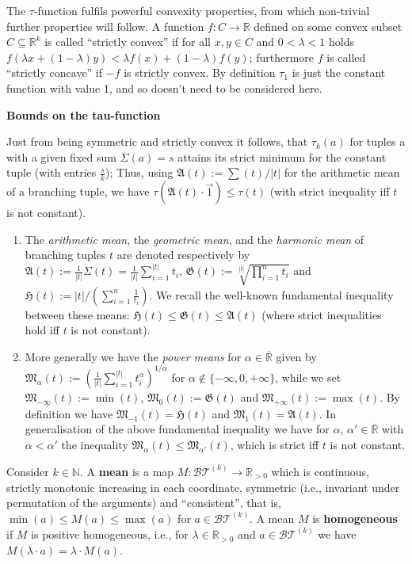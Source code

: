 \documentclass{report}
\begin{document}
\begin{enumerate}
\begin{enumerate}
				The $\tau $-function fulfils powerful convexity properties, from which non-trivial
				further properties will follow. A function $f : C \to \mathbb{R}$ defined on some convex
				subset $C \subseteq \mathbb{R}^k$ is called ``strictly convex'' if for all $x,y \in C$ and $0 < \lambda < 1 $ holds
				$f(\lambda x+(1-\lambda )y) < \lambda f(x)+(1-\lambda )f(y)$; furthermore $f$ is called ``strictly concave''
				if $-f$ is strictly convex. By definition $\tau_1$ is just the constant function with value
				1, and so doesn't need to be considered here.
				
				{\bf Bounds on the tau-function}
				
				Just from being symmetric and strictly convex it follows, that $\tau_k (a)$ for tuples a
				with a given fixed sum $\Sigma (a) = s$ attains its strict minimum for the constant tuple
				(with entries $\frac sk $); Thus, using $\mathfrak{A}(t) :=
				\sum(t)/|t|$ for the arithmetic mean of a branching tuple, we have $\tau (\mathfrak{A}(t) \cdot \vec{1}) \leq \tau (t)$ (with
				strict inequality iff $t$ is not constant).
				
				\begin{enumerate}
					\item The {\it arithmetic mean}, the {\it geometric mean}, and the {\it harmonic mean} of
					branching tuples $t$ are denoted respectively by $\mathfrak{A}(t) :=\frac1{|t|} \Sigma (t) =
					\frac1{|t|}\sum^{|t|}_{i=1} t_i$,
					$\mathfrak{G}(t) :=\sqrt[|t|]{\prod^n_{i=1} t_ i}$
					and $\mathfrak{H}(t) := |t|/(\sum^n_{i=1}\frac1{t_i})$. We recall the well-known
					fundamental inequality between these means: $\mathfrak{H}(t) \leq \mathfrak{G}(t) \leq \mathfrak{A}(t)$ (where
					strict inequalities hold iff $t$ is not constant).
					
					\item More generally we have the {\it power means} for $\alpha \in \overline{\mathbb{R}}$ given by $\mathfrak{M} _\alpha (t) :=(\frac1{|t|}\sum^{|t|}_{i=1} t^\alpha_i)^{1/\alpha}$
					for $\alpha \notin \{-\infty ,0,+\infty \}$, while we set $\mathfrak{M} _{-\infty} (t) := \min(t)$,
					$\mathfrak{M}_ 0 (t) := \mathfrak{G}(t)$ and $\mathfrak{M} _{+\infty} (t) := \max(t)$. By definition we have $\mathfrak{M}_{{-1}} (t) =
					\mathfrak{H}(t)$ and $\mathfrak{M}_ 1 (t) = \mathfrak{A}(t)$. In generalisation of the above fundamental inequality we have for $\alpha $, $\alpha ' \in \overline{\mathbb{R}}$ with $\alpha < \alpha '$ the inequality $\mathfrak{M} _\alpha (t) \leq \mathfrak{M} _{\alpha ' } (t)$,
					which is strict iff $t$ is not constant.
				\end{enumerate}
				{ Consider $k \in \mathbb{N}$. A {\bf mean} is a map $M : \mathcal{BT}^{(k)}
					\to\mathbb{R}_{ >0}$
					which is continuous, strictly monotonic increasing in each coordinate, symmetric
					(i.e., invariant under permutation of the arguments) and ``consistent'', that is,
					$\min(a) \leq M(a) \leq \max(a)$ for $a \in \mathcal{BT}^{(k)}$. A mean $M$ is {\bf homogeneous} if $M $ is
					positive homogeneous, i.e., for $\lambda \in \mathbb{R}_{ >0}$ and $a \in \mathcal{BT}^{(k)}$
					we have $M(\lambda \cdot a) = \lambda \cdot M(a)$.}
				

\end{enumerate}
\end{enumerate}
\end{document}
